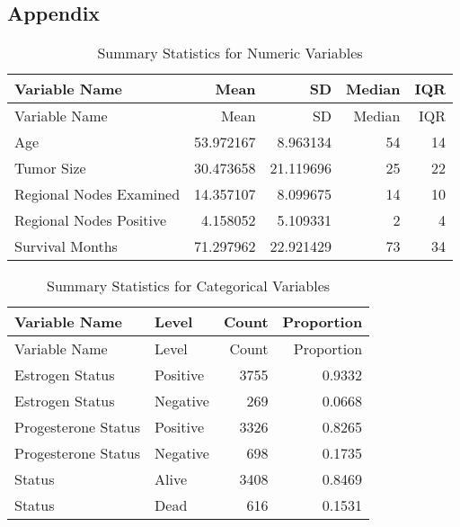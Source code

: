 \documentclass[
]{article}
\begin{document}
\subsection{Appendix}\label{appendix}

\begin{longtable}[]{@{}lrrrr@{}}
\caption{Summary Statistics for Numeric Variables}\tabularnewline
\toprule\noalign{}
Variable Name & Mean & SD & Median & IQR \\
\midrule\noalign{}
\endfirsthead
\toprule\noalign{}
Variable Name & Mean & SD & Median & IQR \\
\midrule\noalign{}
\endhead
\bottomrule\noalign{}
\endlastfoot
Age & 53.972167 & 8.963134 & 54 & 14 \\
Tumor Size & 30.473658 & 21.119696 & 25 & 22 \\
Regional Nodes Examined & 14.357107 & 8.099675 & 14 & 10 \\
Regional Nodes Positive & 4.158052 & 5.109331 & 2 & 4 \\
Survival Months & 71.297962 & 22.921429 & 73 & 34 \\
\end{longtable}

\begin{longtable}[]{@{}llrr@{}}
\caption{Summary Statistics for Categorical Variables}\tabularnewline
\toprule\noalign{}
Variable Name & Level & Count & Proportion \\
\midrule\noalign{}
\endfirsthead
\toprule\noalign{}
Variable Name & Level & Count & Proportion \\
\midrule\noalign{}
\endhead
\bottomrule\noalign{}
\endlastfoot
Estrogen Status & Positive & 3755 & 0.9332 \\
Estrogen Status & Negative & 269 & 0.0668 \\
Progesterone Status & Positive & 3326 & 0.8265 \\
Progesterone Status & Negative & 698 & 0.1735 \\
Status & Alive & 3408 & 0.8469 \\
Status & Dead & 616 & 0.1531 \\
\end{longtable}
\end{document}
